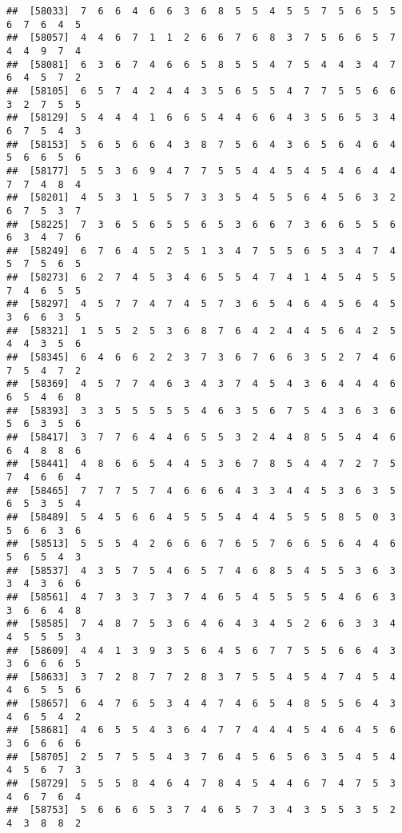 \documentclass[
]{book}
\begin{document}
\begin{verbatim}
##  [58033]  7  6  6  4  6  6  3  6  8  5  5  4  5  5  7  5  6  5  5  6  7  6  4  5
##  [58057]  4  4  6  7  1  1  2  6  6  7  6  8  3  7  5  6  6  5  7  4  4  9  7  4
##  [58081]  6  3  6  7  4  6  6  5  8  5  5  4  7  5  4  4  3  4  7  6  4  5  7  2
##  [58105]  6  5  7  4  2  4  4  3  5  6  5  5  4  7  7  5  5  6  6  3  2  7  5  5
##  [58129]  5  4  4  4  1  6  6  5  4  4  6  6  4  3  5  6  5  3  4  6  7  5  4  3
##  [58153]  5  6  5  6  6  4  3  8  7  5  6  4  3  6  5  6  4  6  4  5  6  6  5  6
##  [58177]  5  5  3  6  9  4  7  7  5  5  4  4  5  4  5  4  6  4  4  7  7  4  8  4
##  [58201]  4  5  3  1  5  5  7  3  3  5  4  5  5  6  4  5  6  3  2  6  7  5  3  7
##  [58225]  7  3  6  5  6  5  5  6  5  3  6  6  7  3  6  6  5  5  6  6  3  4  7  6
##  [58249]  6  7  6  4  5  2  5  1  3  4  7  5  5  6  5  3  4  7  4  5  7  5  6  5
##  [58273]  6  2  7  4  5  3  4  6  5  5  4  7  4  1  4  5  4  5  5  7  4  6  5  5
##  [58297]  4  5  7  7  4  7  4  5  7  3  6  5  4  6  4  5  6  4  5  3  6  6  3  5
##  [58321]  1  5  5  2  5  3  6  8  7  6  4  2  4  4  5  6  4  2  5  4  4  3  5  6
##  [58345]  6  4  6  6  2  2  3  7  3  6  7  6  6  3  5  2  7  4  6  7  5  4  7  2
##  [58369]  4  5  7  7  4  6  3  4  3  7  4  5  4  3  6  4  4  4  6  6  5  4  6  8
##  [58393]  3  3  5  5  5  5  5  4  6  3  5  6  7  5  4  3  6  3  6  5  6  3  5  6
##  [58417]  3  7  7  6  4  4  6  5  5  3  2  4  4  8  5  5  4  4  6  6  4  8  8  6
##  [58441]  4  8  6  6  5  4  4  5  3  6  7  8  5  4  4  7  2  7  5  7  4  6  6  4
##  [58465]  7  7  7  5  7  4  6  6  6  4  3  3  4  4  5  3  6  3  5  6  5  3  5  4
##  [58489]  5  4  5  6  6  4  5  5  5  4  4  4  5  5  5  8  5  0  3  5  6  6  3  6
##  [58513]  5  5  5  4  2  6  6  6  7  6  5  7  6  6  5  6  4  4  6  5  6  5  4  3
##  [58537]  4  3  5  7  5  4  6  5  7  4  6  8  5  4  5  5  3  6  3  3  4  3  6  6
##  [58561]  4  7  3  3  7  3  7  4  6  5  4  5  5  5  5  4  6  6  3  3  6  6  4  8
##  [58585]  7  4  8  7  5  3  6  4  6  4  3  4  5  2  6  6  3  3  4  4  5  5  5  3
##  [58609]  4  4  1  3  9  3  5  6  4  5  6  7  7  5  5  6  6  4  3  3  6  6  6  5
##  [58633]  3  7  2  8  7  7  2  8  3  7  5  5  4  5  4  7  4  5  4  4  6  5  5  6
##  [58657]  6  4  7  6  5  3  4  4  7  4  6  5  4  8  5  5  6  4  3  4  6  5  4  2
##  [58681]  4  6  5  5  4  3  6  4  7  7  4  4  4  5  4  6  4  5  6  3  6  6  6  6
##  [58705]  2  5  7  5  5  4  3  7  6  4  5  6  5  6  3  5  4  5  4  4  5  6  7  3
##  [58729]  5  5  5  8  4  6  4  7  8  4  5  4  4  6  7  4  7  5  3  4  6  7  6  4
##  [58753]  5  6  6  6  5  3  7  4  6  5  7  3  4  3  5  5  3  5  2  4  3  8  8  2

\end{verbatim}
\end{document}
